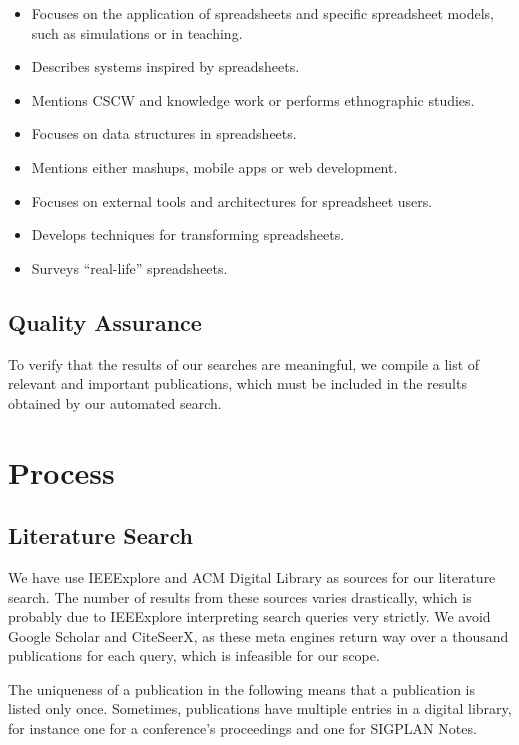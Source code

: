\documentclass[a4paper]{article}
\begin{document}
\begin{itemize}
\item Focuses on the application of spreadsheets and specific
  spreadsheet models, such as simulations or in teaching.
\item Describes systems inspired by spreadsheets.
\item Mentions CSCW and knowledge work or performs ethnographic
  studies.
\item Focuses on data structures in spreadsheets.
\item Mentions either mashups, mobile apps or web development.
\item Focuses on external tools and architectures for spreadsheet
  users.
\item Develops techniques for transforming spreadsheets.
\item Surveys ``real-life'' spreadsheets.
\end{itemize}

\subsection{Quality Assurance}
\label{sec:quality-assurance}

To verify that the results of our searches are meaningful, we compile
a list of relevant and important publications, which must be included
in the results obtained by our automated search.

\section{Process}
\label{sec:process}

\subsection{Literature Search}
\label{sec:literature-search}

We have use IEEExplore and ACM Digital Library as sources for our
literature search. The number of results from these sources varies
drastically, which is probably due to IEEExplore interpreting search
queries very strictly. We avoid Google Scholar and CiteSeerX, as these
meta engines return way over a thousand publications for each query,
which is infeasible for our scope.

The uniqueness of a publication in the following means that a
publication is listed only once. Sometimes, publications have multiple
entries in a digital library, for instance one for a conference's
proceedings and one for SIGPLAN Notes.
\end{document}
